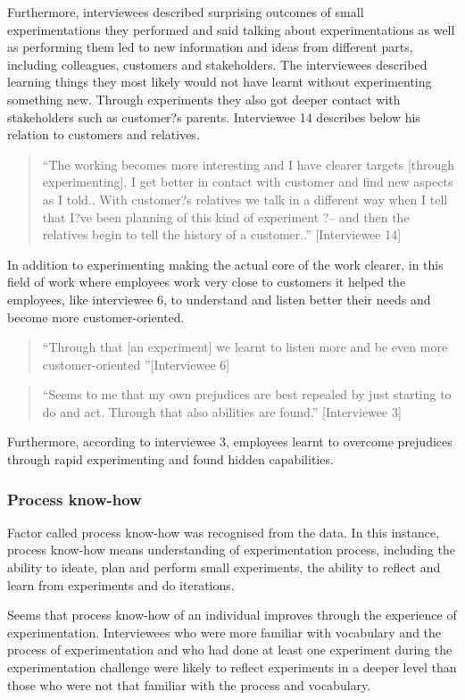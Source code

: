 Furthermore, interviewees described surprising outcomes of small experimentations they performed and said talking about experimentations as well as performing them led to new information and ideas from different parts, including colleagues, customers and stakeholders. The interviewees described learning things they most likely would not have learnt without experimenting something new. Through experiments they also got deeper contact with stakeholders such as customer?s parents. Interviewee 14 describes below his relation to customers and relatives.
\begin{quote}
``The working becomes more interesting and I have clearer targets [through experimenting]. I get better in contact with customer and find new aspects as I told.. With customer?s relatives we talk in a different way when I tell that I?ve been planning of this kind of experiment ?-- and then the relatives begin to tell the history of a customer..'' [Interviewee 14]
\end{quote}
In addition to experimenting making the actual core of the work clearer, in this field of work where employees work very close to customers it helped the employees, like interviewee 6, to understand and listen better their needs and become more customer-oriented.  
\begin{quote}
``Through that [an experiment] we learnt to listen more and be even more customer-oriented ''[Interviewee 6]
\end{quote}
\begin{quote}
``Seems to me that my own prejudices are best repealed by just starting to do and act. Through that also abilities are found.'' [Interviewee 3]
\end{quote}
Furthermore, according to interviewee 3, employees learnt to overcome prejudices through rapid experimenting and found hidden capabilities.

\subsubsection{Process know-how}
Factor called process know-how was recognised from the data. In this instance, process know-how means understanding of experimentation process, including the ability to ideate, plan and perform small experiments, the ability to reflect and learn from experiments and do iterations. 

Seems that process know-how of an individual improves through the experience of experimentation. Interviewees who were more familiar with vocabulary and the process of experimentation and who had done at least one experiment during the experimentation challenge were likely to reflect experiments in a deeper level than those who were not that familiar with the process and vocabulary. 

